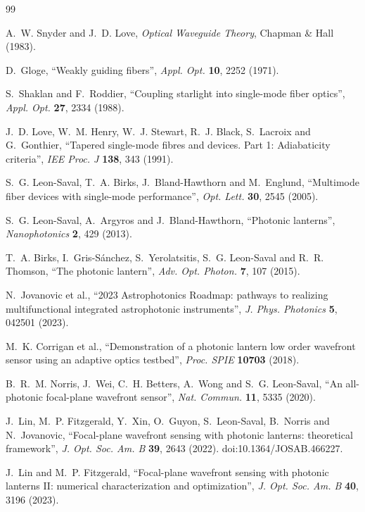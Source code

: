 \documentclass[11pt,a4paper]{article}
\begin{document}
\begin{thebibliography}{99}

A.~W. Snyder and J.~D. Love, \emph{Optical Waveguide Theory}, Chapman \& Hall (1983).

D.~Gloge, ``Weakly guiding fibers'', \emph{Appl. Opt.} \textbf{10}, 2252 (1971).

S.~Shaklan and F.~Roddier, ``Coupling starlight into single-mode fiber optics'', \emph{Appl. Opt.} \textbf{27}, 2334 (1988).

J.~D. Love, W.~M. Henry, W.~J. Stewart, R.~J. Black, S.~Lacroix and G.~Gonthier, ``Tapered single-mode fibres and devices. Part 1: Adiabaticity criteria'', \emph{IEE Proc. J} \textbf{138}, 343 (1991).

S.~G. Leon-Saval, T.~A. Birks, J.~Bland-Hawthorn and M.~Englund, ``Multimode fiber devices with single-mode performance'', \emph{Opt. Lett.} \textbf{30}, 2545 (2005).

S.~G. Leon-Saval, A.~Argyros and J.~Bland-Hawthorn, ``Photonic lanterns'', \emph{Nanophotonics} \textbf{2}, 429 (2013).

T.~A. Birks, I.~Gris-S\'anchez, S.~Yerolatsitis, S.~G. Leon-Saval and R.~R. Thomson, ``The photonic lantern'', \emph{Adv. Opt. Photon.} \textbf{7}, 107 (2015).

N.~Jovanovic et al., ``2023 Astrophotonics Roadmap: pathways to realizing multifunctional integrated astrophotonic instruments'', \emph{J. Phys. Photonics} \textbf{5}, 042501 (2023).

M.~K. Corrigan et al., ``Demonstration of a photonic lantern low order wavefront sensor using an adaptive optics testbed'', \emph{Proc. SPIE} \textbf{10703} (2018).

B.~R.~M. Norris, J.~Wei, C.~H. Betters, A.~Wong and S.~G. Leon-Saval, ``An all-photonic focal-plane wavefront sensor'', \emph{Nat. Commun.} \textbf{11}, 5335 (2020).

J.~Lin, M.~P. Fitzgerald, Y.~Xin, O.~Guyon, S.~Leon-Saval, B.~Norris and N.~Jovanovic, ``Focal-plane wavefront sensing with photonic lanterns: theoretical framework'', \emph{J. Opt. Soc. Am. B} \textbf{39}, 2643 (2022). doi:10.1364/JOSAB.466227.

J.~Lin and M.~P. Fitzgerald, ``Focal-plane wavefront sensing with photonic lanterns II: numerical characterization and optimization'', \emph{J. Opt. Soc. Am. B} \textbf{40}, 3196 (2023).


\end{thebibliography}
\end{document}
